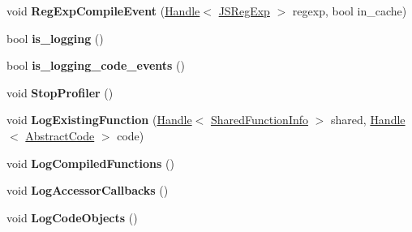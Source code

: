 \begin{DoxyCompactItemize}
\item 
void {\bfseries Reg\+Exp\+Compile\+Event} (\hyperlink{classv8_1_1internal_1_1_handle}{Handle}$<$ \hyperlink{classv8_1_1internal_1_1_j_s_reg_exp}{J\+S\+Reg\+Exp} $>$ regexp, bool in\+\_\+cache)\hypertarget{classv8_1_1internal_1_1_logger_ab86c8d7f4c3bd5fe25da5d2e06e22ab7}{}\label{classv8_1_1internal_1_1_logger_ab86c8d7f4c3bd5fe25da5d2e06e22ab7}

\item 
bool {\bfseries is\+\_\+logging} ()\hypertarget{classv8_1_1internal_1_1_logger_aed323c6dffe4aabc969b080bfe782adf}{}\label{classv8_1_1internal_1_1_logger_aed323c6dffe4aabc969b080bfe782adf}

\item 
bool {\bfseries is\+\_\+logging\+\_\+code\+\_\+events} ()\hypertarget{classv8_1_1internal_1_1_logger_a2e0360fdc59a61c63402a1bc24147cdd}{}\label{classv8_1_1internal_1_1_logger_a2e0360fdc59a61c63402a1bc24147cdd}

\item 
void {\bfseries Stop\+Profiler} ()\hypertarget{classv8_1_1internal_1_1_logger_af83f62b2d37eb53cf3b89eb10ee17bbe}{}\label{classv8_1_1internal_1_1_logger_af83f62b2d37eb53cf3b89eb10ee17bbe}

\item 
void {\bfseries Log\+Existing\+Function} (\hyperlink{classv8_1_1internal_1_1_handle}{Handle}$<$ \hyperlink{classv8_1_1internal_1_1_shared_function_info}{Shared\+Function\+Info} $>$ shared, \hyperlink{classv8_1_1internal_1_1_handle}{Handle}$<$ \hyperlink{classv8_1_1internal_1_1_abstract_code}{Abstract\+Code} $>$ code)\hypertarget{classv8_1_1internal_1_1_logger_a69a15af625beb6a875fc2734ba422afc}{}\label{classv8_1_1internal_1_1_logger_a69a15af625beb6a875fc2734ba422afc}

\item 
void {\bfseries Log\+Compiled\+Functions} ()\hypertarget{classv8_1_1internal_1_1_logger_a7372775745f2f974a600996232acc7d6}{}\label{classv8_1_1internal_1_1_logger_a7372775745f2f974a600996232acc7d6}

\item 
void {\bfseries Log\+Accessor\+Callbacks} ()\hypertarget{classv8_1_1internal_1_1_logger_a4d77e3ce92369187c58127754a9fa149}{}\label{classv8_1_1internal_1_1_logger_a4d77e3ce92369187c58127754a9fa149}

\item 
void {\bfseries Log\+Code\+Objects} ()\hypertarget{classv8_1_1internal_1_1_logger_acf57b8270cf5f12f6b1c1a4810011306}{}\label{classv8_1_1internal_1_1_logger_acf57b8270cf5f12f6b1c1a4810011306}


\end{DoxyCompactItemize}
